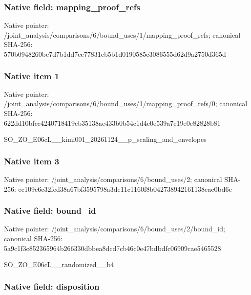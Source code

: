 \documentclass[10pt,a4paper]{article}
\begin{document}
\subsubsection{Native field: mapping\_proof\_refs}


Native pointer: /joint\_analysis/comparis\allowbreak{}ons/6/bound\_uses/1/mappi\allowbreak{}ng\_proof\_refs; canonical SHA-256: 570b0948260bc7d7b1dd7ee7\allowbreak{}7831eb5b1d0190585c308655\allowbreak{}5d62d9a2750d365d



\subsubsection{Native item 1}


Native pointer: /joint\_analysis/comparis\allowbreak{}ons/6/bound\_uses/1/mappi\allowbreak{}ng\_proof\_refs/0; canonical SHA-256: 622dd10bfcc4240718419cb3\allowbreak{}5138ae433b0b54c1d4c0e539\allowbreak{}a7c19e0e82828b81


SO\_ZO\_E06cL\_\_kimi001\_202\allowbreak{}61124\_\_p\_scaling\_and\_env\allowbreak{}elopes


\subsubsection{Native item 3}


Native pointer: /joint\_analysis/comparis\allowbreak{}ons/6/bound\_uses/2; canonical SHA-256: ee109c6c32fed38a67bf3595\allowbreak{}798a3de11c1160f8b0427389\allowbreak{}42161138eac0bd6c



\subsubsection{Native field: bound\_id}


Native pointer: /joint\_analysis/comparis\allowbreak{}ons/6/bound\_uses/2/bound\allowbreak{}\_id; canonical SHA-256: 5a9c1f3c852365964b266330\allowbreak{}dbbea8dcd7cb46c0e47bdbdf\allowbreak{}c06909cae5465528


SO\_ZO\_E06cL\_\_randomized\_\_b4


\subsubsection{Native field: disposition}
\end{document}
